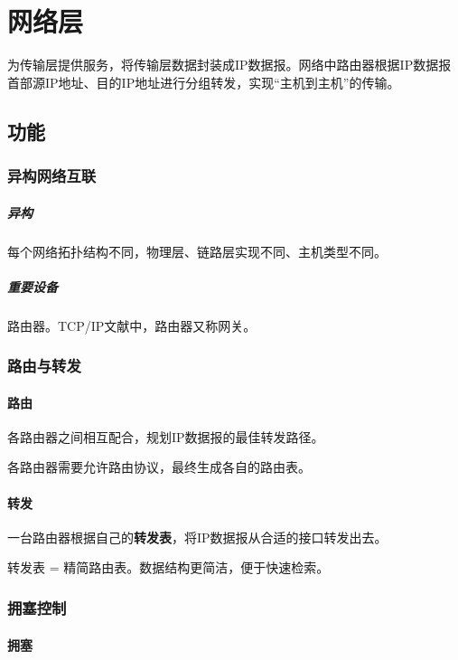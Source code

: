 
\chapter{网络层}

为传输层提供服务，将传输层数据封装成IP数据报。网络中路由器根据IP数据报首部源IP地址、目的IP地址进行分组转发，实现“主机到主机”的传输。

\section{功能}

\subsection{异构网络互联}

\paragraph{异构}
每个网络拓扑结构不同，物理层、链路层实现不同、主机类型不同。


\paragraph{重要设备}
路由器。TCP/IP文献中，路由器又称网关。


\subsection{路由与转发}

\subsubsection{路由}
各路由器之间相互配合，规划IP数据报的最佳转发路径。

各路由器需要允许路由协议，最终生成各自的路由表。


\subsubsection{转发}
一台路由器根据自己的\textbf{转发表}，将IP数据报从合适的接口转发出去。

转发表 = 精简路由表。数据结构更简洁，便于快速检索。


\subsection{拥塞控制}

\subsubsection{拥塞}

